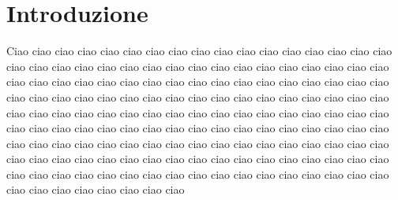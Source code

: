 

\chapter*{Introduzione}
Ciao ciao ciao ciao ciao ciao ciao ciao ciao ciao ciao ciao ciao ciao ciao ciao ciao ciao ciao ciao ciao ciao ciao ciao ciao ciao ciao ciao ciao ciao ciao ciao ciao ciao ciao ciao ciao ciao ciao ciao ciao ciao ciao ciao ciao ciao ciao ciao ciao ciao ciao ciao ciao ciao ciao ciao ciao ciao ciao ciao ciao ciao ciao ciao ciao ciao ciao ciao ciao ciao ciao ciao ciao ciao ciao ciao ciao ciao ciao ciao ciao ciao ciao ciao ciao ciao ciao ciao ciao ciao ciao ciao ciao ciao ciao ciao ciao ciao ciao ciao ciao ciao ciao ciao ciao ciao ciao ciao ciao ciao ciao ciao ciao ciao ciao ciao ciao ciao ciao ciao ciao ciao ciao ciao ciao ciao ciao ciao ciao ciao ciao ciao ciao ciao ciao ciao ciao ciao ciao ciao ciao ciao ciao ciao ciao ciao ciao ciao ciao ciao ciao ciao ciao ciao ciao ciao ciao ciao ciao ciao ciao